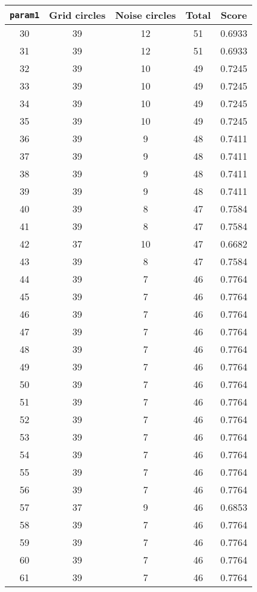 \documentclass[letterpaper, 12pt]{article}
\begin{document}
\begin{longtable}{|c|c|c|c|c|}
\hline
\textbf{\texttt{param1}} & \textbf{Grid circles} & \textbf{Noise circles} & \textbf{Total} & \textbf{Score} \\
\hline
30 & 39 & 12 & 51 & 0.6933 \\
\hline
31 & 39 & 12 & 51 & 0.6933 \\
\hline
32 & 39 & 10 & 49 & 0.7245 \\
\hline
33 & 39 & 10 & 49 & 0.7245 \\
\hline
34 & 39 & 10 & 49 & 0.7245 \\
\hline
35 & 39 & 10 & 49 & 0.7245 \\
\hline
36 & 39 & 9 & 48 & 0.7411 \\
\hline
37 & 39 & 9 & 48 & 0.7411 \\
\hline
38 & 39 & 9 & 48 & 0.7411 \\
\hline
39 & 39 & 9 & 48 & 0.7411 \\
\hline
40 & 39 & 8 & 47 & 0.7584 \\
\hline
41 & 39 & 8 & 47 & 0.7584 \\
\hline
42 & 37 & 10 & 47 & 0.6682 \\
\hline
43 & 39 & 8 & 47 & 0.7584 \\
\hline
44 & 39 & 7 & 46 & 0.7764 \\
\hline
45 & 39 & 7 & 46 & 0.7764 \\
\hline
46 & 39 & 7 & 46 & 0.7764 \\
\hline
47 & 39 & 7 & 46 & 0.7764 \\
\hline
48 & 39 & 7 & 46 & 0.7764 \\
\hline
49 & 39 & 7 & 46 & 0.7764 \\
\hline
50 & 39 & 7 & 46 & 0.7764 \\
\hline
51 & 39 & 7 & 46 & 0.7764 \\
\hline
52 & 39 & 7 & 46 & 0.7764 \\
\hline
53 & 39 & 7 & 46 & 0.7764 \\
\hline
54 & 39 & 7 & 46 & 0.7764 \\
\hline
55 & 39 & 7 & 46 & 0.7764 \\
\hline
56 & 39 & 7 & 46 & 0.7764 \\
\hline
57 & 37 & 9 & 46 & 0.6853 \\
\hline
58 & 39 & 7 & 46 & 0.7764 \\
\hline
59 & 39 & 7 & 46 & 0.7764 \\
\hline
60 & 39 & 7 & 46 & 0.7764 \\
\hline
61 & 39 & 7 & 46 & 0.7764 \\

\end{longtable}
\end{document}

